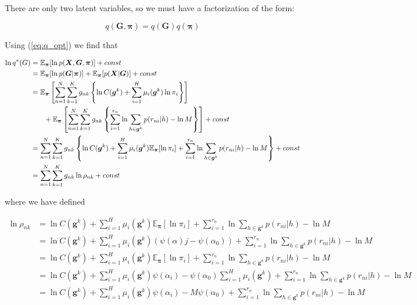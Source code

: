 \documentclass{article}
\begin{document}
There are only two latent variables, so we must have a factorization of the form:

\begin{equation}
q(\boldsymbol{G}, \boldsymbol{\pi}) = q(\boldsymbol{G})q(\boldsymbol{\pi})
\end{equation}

Using (\ref{eq:q_opt}) we find that

\begin{align}
    \ln q^*(G) &= \mathbb{E}_{\boldsymbol{\pi}}[\ln p(\boldsymbol{X}, \boldsymbol{G}, \boldsymbol{\pi})] + const\\
    &= \mathbb{E}_{\boldsymbol{\pi}}[\ln p(\boldsymbol{G} | \boldsymbol{\pi})] + \mathbb{E}_{\boldsymbol{\pi}}[p(\boldsymbol{X} | \boldsymbol{G})] + const\\
    &= \mathbb{E}_{\boldsymbol{\pi}}\left[ \sum_{n = 1}^N \sum_{k = 1}^K g_{nk} \left\{ \ln C(\boldsymbol{g}^k) + \sum_{i = 1}^H \mu_i(\boldsymbol{g}^k) \ln \pi_i \right\} \right] \notag\\ &\phantom{{}=1} + \mathbb{E}_{\boldsymbol{\pi}}\left[ \sum_{n = 1}^N \sum_{k = 1}^K g_{nk} \left\{ \sum_{i = 1}^{r_n} \ln \sum_{h \in \boldsymbol{g}^k} p(r_{ni} | h) - \ln M \right\} \right] + const\\
    &= \sum_{n = 1}^N \sum_{k = 1}^K g_{nk} \left\{ \ln C(\boldsymbol{g}^k) + \sum_{i = 1}^H \mu_i(\boldsymbol{g}^k) \mathbb{E}_{\boldsymbol{\pi}}[\ln \pi_i] + \sum_{i = 1}^{r_n} \ln \sum_{h \in \boldsymbol{g}^k} p(r_{ni} | h) - \ln M \right\} + const\\
    &= \sum_{n = 1}^N \sum_{k = 1}^K g_{nk} \ln \rho_{nk} + const
\end{align}

where we have defined

\begin{align}
    \ln \rho_{nk} &= \ln C(\boldsymbol{g}^k) + \sum_{i = 1}^H \mu_i(\boldsymbol{g}^k) \mathbb{E}_{\boldsymbol{\pi}}[\ln \pi_i] + \sum_{i = 1}^{r_n} \ln \sum_{h \in \boldsymbol{g}^k} p(r_{ni} | h) - \ln M\\
    &= \ln C(\boldsymbol{g}^k) + \sum_{i = 1}^H \mu_i(\boldsymbol{g}^k) (\psi(\alpha)j - \psi(\alpha_0)) + \sum_{i = 1}^{r_n} \ln \sum_{h \in \boldsymbol{g}^k} p(r_{ni} | h) - \ln M\\
    &= \ln C(\boldsymbol{g}^k) + \sum_{i = 1}^H \mu_i(\boldsymbol{g}^k) \mathbb{E}_{\boldsymbol{\pi}}[\ln \pi_i] + \sum_{i = 1}^{r_n} \ln \sum_{h \in \boldsymbol{g}^k} p(r_{ni} | h) - \ln M\\
    &= \ln C(\boldsymbol{g}^k) + \sum_{i = 1}^H \mu_i(\boldsymbol{g}^k) \psi(\alpha_i) - \psi(\alpha_0)\sum_{i = 1}^H \mu_i(\boldsymbol{g}^k) + \sum_{i = 1}^{r_n} \ln \sum_{h \in \boldsymbol{g}^k} p(r_{ni} | h) - \ln M\\
    &= \ln C(\boldsymbol{g}^k) + \sum_{i = 1}^H \mu_i(\boldsymbol{g}^k) \psi(\alpha_i) - M\psi(\alpha_0) + \sum_{i = 1}^{r_n} \ln \sum_{h \in \boldsymbol{g}^k} p(r_{ni} | h) - \ln M
\end{align}
\end{document}
